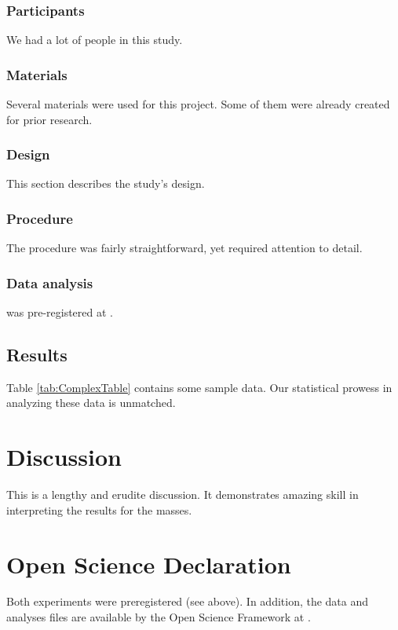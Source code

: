 \documentclass[doc, a4paper, apacite]{apa6}
\begin{document}
\subsubsection{Participants}
We had a lot of people in this study.

\subsubsection{Materials}
Several materials were used for this project.  Some of them were
already created for prior research.

\subsubsection{Design}
This section describes the study's design.

\subsubsection{Procedure}
The procedure was fairly straightforward, yet required
attention to detail.

\subsubsection{Data analysis}
 was pre-registered at \url{}.

\subsection{Results}
Table \ref{tab:ComplexTable} contains some sample data.  Our
statistical prowess in analyzing these data is unmatched.


\section{Discussion}
This is a lengthy and erudite discussion.  It demonstrates amazing
skill in interpreting the results for the masses.

\section{Open Science Declaration}
Both experiments were preregistered (see above). In addition, the data and analyses files are available by the Open Science Framework at \url{}. 

\clearpage
\newpage


\end{document}

